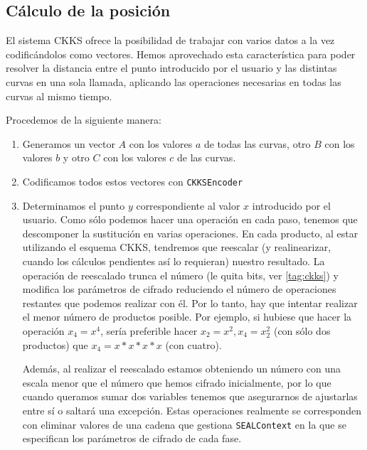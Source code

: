 \subsection{Cálculo de la posición}

El sistema CKKS ofrece la posibilidad de trabajar con varios datos a la vez codificándolos como vectores. Hemos aprovechado esta característica para poder resolver la distancia entre el punto introducido por el usuario y las distintas curvas en una sola llamada, aplicando las operaciones necesarias en todas las curvas al mismo tiempo.

Procedemos de la siguiente manera:

\begin{enumerate}
    \item Generamos un vector $A$ con los valores $a$ de todas las curvas, otro $B$ con los valores $b$ y otro $C$ con los valores $c$ de las curvas.
    \item Codificamos todos estos vectores con \verb|CKKSEncoder|

    \item Determinamos el punto $y$ correspondiente al valor $x$ introducido por el usuario.
    Como sólo podemos hacer una operación en cada paso, tenemos que descomponer la sustitución en varias operaciones. En cada producto, al estar utilizando el esquema CKKS, tendremos que reescalar (y realinearizar, cuando los cálculos pendientes así lo requieran) nuestro resultado. La operación de reescalado trunca el número (le quita bits, ver \ref{tag:ckks}) y modifica los parámetros de cifrado reduciendo el número de operaciones restantes que podemos realizar con él. Por lo tanto, hay que intentar realizar el menor número de productos posible. Por ejemplo, si hubiese que hacer la operación $x_4=x^4$, sería preferible hacer $x_2 = x^2, x_4 = x_2^2$ (con sólo dos productos) que $x_4 = x * x * x * x$ (con cuatro).

    Además, al realizar el reescalado estamos obteniendo un número con una escala menor que el número que hemos cifrado inicialmente, por lo que cuando queramos sumar dos variables tenemos que asegurarnos de ajustarlas entre sí o saltará una excepción. Estas operaciones realmente se corresponden con eliminar valores de una cadena que gestiona \verb|SEALContext| en la que se especifican los parámetros de cifrado de cada fase.


\end{enumerate}

